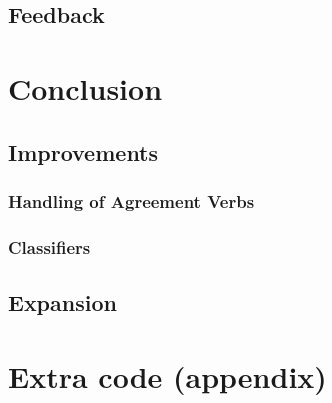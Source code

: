 \documentclass[12pt]{ociamthesis}  %
\begin{document}
\section{Feedback}


\chapter{Conclusion}

\section{Improvements}
	\subsection{Handling of Agreement Verbs}
	\subsection{Classifiers}
\section{Expansion}


\appendix
\chapter{Extra code (appendix)}

\newpage

\makeatletter
\renewcommand\@biblabel[1]{}
\makeatother
{}
\end{document}
